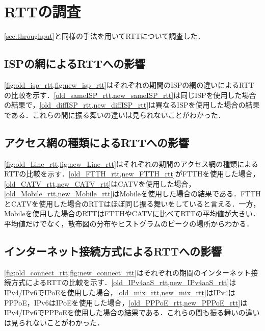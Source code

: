 \section{RTTの調査}
\label{sec:rtt}
\cref{sec:throughput}と同様の手法を用いてRTTについて調査した．
\subsection{ISPの網によるRTTへの影響}
\cref{fig:old_isp_rtt,fig:new_isp_rtt}はそれぞれの期間のISPの網の違いによるRTTの比較を示す．\cref{old_sameISP_rtt,new_sameISP_rtt}は同じISPを使用した場合の結果で，\cref{old_diffISP_rtt,new_diffISP_rtt}は異なるISPを使用した場合の結果である．これらの間に振る舞いの違いは見られないことがわかった．


\subsection{アクセス網の種類によるRTTへの影響}
\cref{fig:old_Line_rtt,fig:new_Line_rtt}はそれぞれの期間のアクセス網の種類によるRTTの比較を示す．\cref{old_FTTH_rtt,new_FTTH_rtt}がFTTHを使用した場合，\cref{old_CATV_rtt,new_CATV_rtt}はCATVを使用した場合，\cref{old_Mobile_rtt,new_Mobile_rtt}はMobileを使用した場合の結果である．FTTHとCATVを使用した場合のRTTはほぼ同じ振る舞いをしていると言える．一方，Mobileを使用した場合のRTTはFTTHやCATVに比べてRTTの平均値が大きい．平均値だけでなく，散布図の分布やヒストグラムのピークの場所からわかる．

\subsection{インターネット接続方式によるRTTへの影響}
\cref{fig:old_connect_rtt,fig:new_connect_rtt}はそれぞれの期間のインターネット接続方式によるRTTの比較を示す．\cref{old_IPv4aaS_rtt,new_IPv4aaS_rtt}はIPv4/IPv6でIPoEを使用した場合，\cref{old_mix_rtt,new_mix_rtt}はIPv4はPPPoE，IPv6はIPoEを使用した場合，\cref{old_PPPoE_rtt,new_PPPoE_rtt}はIPv4/IPv6でPPPoEを使用した場合の結果である．これらの間も振る舞いの違いは見られないことがわかった．

